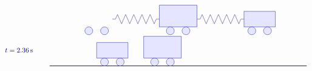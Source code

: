 \begin{solution}
\begin{itemize}
\begin{equation*}
\begin{tikzpicture}[scale=0.8, color=blue!50!black]
\begin{scope}[yshift=-4cm]
\begin{scope}[xshift=0cm]
            \draw[fill=blue!10] (2.5,0.25) circle (0.25);
            \draw[fill=blue!10] (3.5,0.25) circle (0.25);
          \end{scope}
          \begin{scope}[xshift=5.2cm]
            \draw[fill=blue!10] (1.8,0.5) rectangle (4.2,1.9);
            \draw[fill=blue!10] (2.5,0.25) circle (0.25);
            \draw[fill=blue!10] (3.5,0.25) circle (0.25);
          \end{scope}
          \begin{scope}[xshift=10.4cm]
            \draw[fill=blue!10] (2,0.5) rectangle (4,1.5);
            \draw[fill=blue!10] (2.5,0.25) circle (0.25);
            \draw[fill=blue!10] (3.5,0.25) circle (0.25);
          \end{scope}
          \begin{scope}[xshift=4cm]
            \draw (0,1) -- ++(0.2,0) -- ++(0.13,0.3)
            -- ++(0.26,-0.6) -- ++(0.26,0.6)
            -- ++(0.26,-0.6) -- ++(0.26,0.6)
            -- ++(0.26,-0.6) -- ++(0.26,0.6)
            -- ++(0.26,-0.6) -- ++(0.26,0.6)
            -- ++(0.26,-0.6) -- ++(0.13,0.3)
            -- ++(0.2,0);
          \end{scope}
          \begin{scope}[xshift=9.4cm]
            \draw (0,1) -- ++(0.2,0) -- ++(0.13,0.3)
            -- ++(0.26,-0.6) -- ++(0.26,0.6)
            -- ++(0.26,-0.6) -- ++(0.26,0.6)
            -- ++(0.26,-0.6) -- ++(0.26,0.6)
            -- ++(0.26,-0.6) -- ++(0.26,0.6)
            -- ++(0.26,-0.6) -- ++(0.13,0.3)
            -- ++(0.2,0);
          \end{scope}
        \end{scope}
        \begin{scope}[yshift=-6cm]
          \draw (-3,1) node[right] {$t=2.36\s$};
          \draw[thick] (0,0) -- (16.4,0);
          \begin{scope}[xshift=1cm]
            \draw[fill=blue!10] (2,0.5) rectangle (4,1.5);
            \draw[fill=blue!10] (2.5,0.25) circle (0.25);
            \draw[fill=blue!10] (3.5,0.25) circle (0.25);
          \end{scope}
          \begin{scope}[xshift=4.2cm]
            \draw[fill=blue!10] (1.8,0.5) rectangle (4.2,1.9);
            \draw[fill=blue!10] (2.5,0.25) circle (0.25);
            \draw[fill=blue!10] (3.5,0.25) circle (0.25);
          \end{scope}
          \begin{scope}[xshift=11.4cm]

\end{scope}
\end{scope}
\end{tikzpicture}
\end{equation*}
\end{itemize}
\end{solution}
